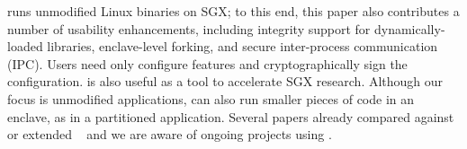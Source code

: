 \graphenesgx{} runs unmodified Linux binaries on SGX; to this end,
this paper also contributes a number of usability enhancements,
including integrity support for dynamically-loaded libraries,
enclave-level forking, and secure inter-process communication (IPC).
Users need only configure features and cryptographically sign the configuration.
\graphenesgx{} is also useful as a tool to accelerate SGX research.
Although our focus is unmodified applications, \graphenesgx{} can also run smaller pieces of
code in an enclave, as in a partitioned application.
Several papers already compared against or extended 
\graphenesgx{}~\cite{shinde17panoply, orenbach17eleos, kim2017enhancing}
and we are aware of ongoing projects using \graphenesgx{}.


